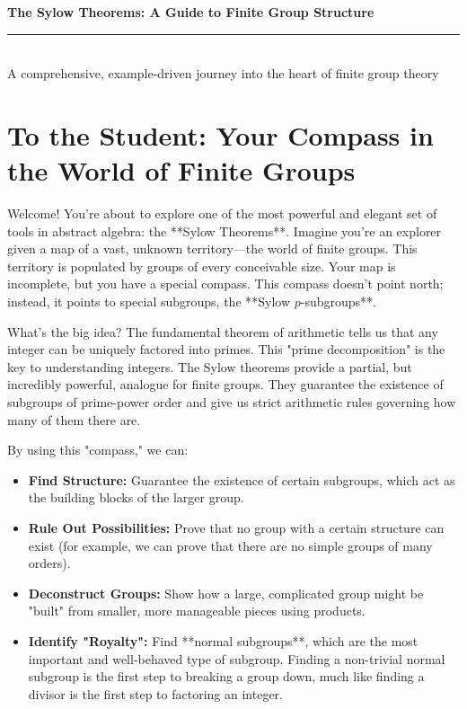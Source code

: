 \documentclass[12pt,a4paper]{article}
\theoremstyle{plain} %
\theoremstyle{definition} %
\theoremstyle{remark} %
\begin{document}
\begin{center}
  {\Huge\bfseries The Sylow Theorems: A Guide to Finite Group Structure}\\[-2pt]
  \rule{0.95\textwidth}{1.2pt}\\[4pt]
  {\Large A comprehensive, example-driven journey into the heart of finite group theory}
\end{center}

\begin{center}
\end{center}

\section*{To the Student: Your Compass in the World of Finite Groups}

Welcome! You're about to explore one of the most powerful and elegant set of tools in abstract algebra: the **Sylow Theorems**. Imagine you're an explorer given a map of a vast, unknown territory—the world of finite groups. This territory is populated by groups of every conceivable size. Your map is incomplete, but you have a special compass. This compass doesn't point north; instead, it points to special subgroups, the **Sylow $p$-subgroups**.

What's the big idea? The fundamental theorem of arithmetic tells us that any integer can be uniquely factored into primes. This "prime decomposition" is the key to understanding integers. The Sylow theorems provide a partial, but incredibly powerful, analogue for finite groups. They guarantee the existence of subgroups of prime-power order and give us strict arithmetic rules governing how many of them there are.

By using this "compass," we can:
\begin{itemize}[label=\textbf{--}]
  \item \textbf{Find Structure:} Guarantee the existence of certain subgroups, which act as the building blocks of the larger group.
  \item \textbf{Rule Out Possibilities:} Prove that no group with a certain structure can exist (for example, we can prove that there are no simple groups of many orders).
  \item \textbf{Deconstruct Groups:} Show how a large, complicated group might be "built" from smaller, more manageable pieces using products.
  \item \textbf{Identify "Royalty":} Find **normal subgroups**, which are the most important and well-behaved type of subgroup. Finding a non-trivial normal subgroup is the first step to breaking a group down, much like finding a divisor is the first step to factoring an integer.
\end{itemize}
\end{document}
